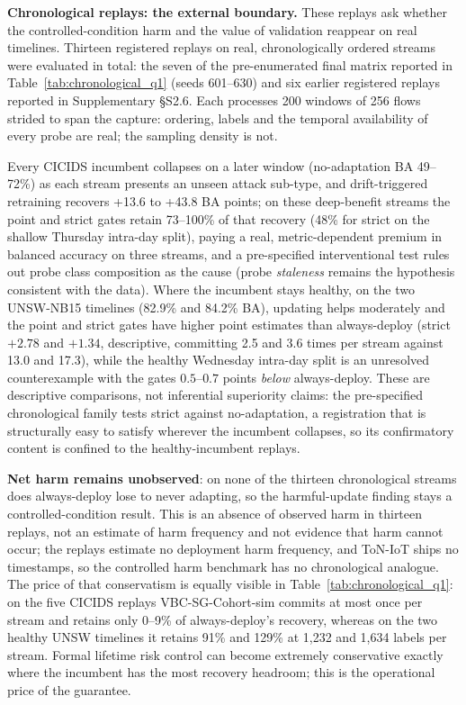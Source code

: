 \documentclass[journal]{IEEEtran}
\begin{document}
\textbf{Chronological replays: the external boundary.} These replays ask whether the controlled-condition harm and the value of validation reappear on real timelines. Thirteen registered replays on real, chronologically ordered streams were evaluated in total: the seven of the pre-enumerated final matrix reported in Table~\ref{tab:chronological_q1} (seeds 601--630) and six earlier registered replays reported in Supplementary \S S2.6. Each processes 200 windows of 256 flows strided to span the capture: ordering, labels and the temporal availability of every probe are real; the sampling density is not.

Every CICIDS incumbent collapses on a later window (no-adaptation BA 49--72\%) as each stream presents an unseen attack sub-type, and drift-triggered retraining recovers +13.6 to +43.8 BA points; on these deep-benefit streams the point and strict gates retain 73--100\% of that recovery (48\% for strict on the shallow Thursday intra-day split), paying a real, metric-dependent premium in balanced accuracy on three streams, and a pre-specified interventional test rules out probe class composition as the cause (probe \emph{staleness} remains the hypothesis consistent with the data). Where the incumbent stays healthy, on the two UNSW-NB15 timelines (82.9\% and 84.2\% BA), updating helps moderately and the point and strict gates have higher point estimates than always-deploy (strict $+2.78$ and $+1.34$, descriptive, committing 2.5 and 3.6 times per stream against 13.0 and 17.3), while the healthy Wednesday intra-day split is an unresolved counterexample with the gates $0.5$--$0.7$ points \emph{below} always-deploy. These are descriptive comparisons, not inferential superiority claims: the pre-specified chronological family tests strict against no-adaptation, a registration that is structurally easy to satisfy wherever the incumbent collapses, so its confirmatory content is confined to the healthy-incumbent replays.

\textbf{Net harm remains unobserved}: on none of the thirteen chronological streams does always-deploy lose to never adapting, so the harmful-update finding stays a controlled-condition result. This is an absence of observed harm in thirteen replays, not an estimate of harm frequency and not evidence that harm cannot occur; the replays estimate no deployment harm frequency, and ToN-IoT ships no timestamps, so the controlled harm benchmark has no chronological analogue. The price of that conservatism is equally visible in Table~\ref{tab:chronological_q1}: on the five CICIDS replays VBC-SG-Cohort-sim commits at most once per stream and retains only 0--9\% of always-deploy's recovery, whereas on the two healthy UNSW timelines it retains 91\% and 129\% at 1{,}232 and 1{,}634 labels per stream. Formal lifetime risk control can become extremely conservative exactly where the incumbent has the most recovery headroom; this is the operational price of the guarantee.
\end{document}
